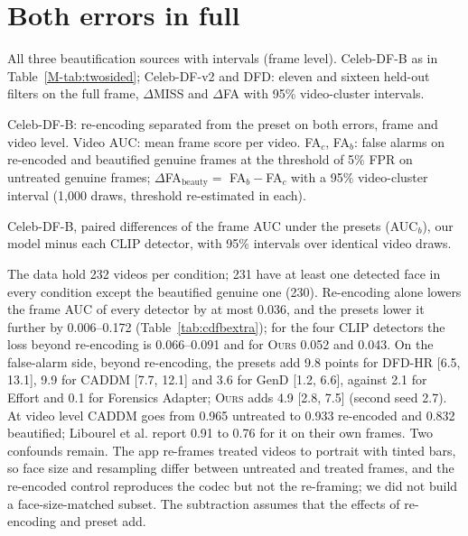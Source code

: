 \documentclass[10pt]{article}
\newcommand{\ours}{\textsc{Ours}}
\begin{document}
\section{Both errors in full}
\label{sec:twosidedfull}
\begin{table}[H]
\centering
\caption{All three beautification sources with intervals (frame level). Celeb-DF-B as in Table~\ref{M-tab:twosided}; Celeb-DF-v2
and DFD: eleven and sixteen held-out filters on the full frame, $\Delta$MISS and $\Delta$FA with 95\% video-cluster intervals.}
\label{tab:twosidedfull}
\scriptsize
\begin{adjustbox}{max width=\linewidth}\end{adjustbox}
\end{table}
\begin{table}[H]
\centering
\caption{Celeb-DF-B: re-encoding separated from the preset on both errors, frame and video level. Video AUC: mean frame score per
video. FA$_c$, FA$_b$: false alarms on re-encoded and beautified genuine frames at the threshold of 5\% FPR on untreated genuine
frames; $\Delta$FA$_\text{beauty}=$ FA$_b-$FA$_c$ with a 95\% video-cluster interval (1,000 draws, threshold re-estimated in each).}
\label{tab:cdfbextra}
\scriptsize
\begin{adjustbox}{max width=\linewidth}\end{adjustbox}
\end{table}
\begin{table}[H]
\centering
\caption{Celeb-DF-B, paired differences of the frame AUC under the presets (AUC$_b$), our model minus each CLIP detector, with
95\% intervals over identical video draws.}
\label{tab:cdfbpaired}
\footnotesize
\begin{adjustbox}{max width=\linewidth}\end{adjustbox}
\end{table}
The data hold 232 videos per condition; 231 have at least one detected face in every condition except the beautified genuine one
(230). Re-encoding alone lowers the frame AUC of every detector by at most 0.036, and the presets lower it further by 0.006--0.172
(Table~\ref{tab:cdfbextra}); for the four CLIP detectors the loss beyond re-encoding is 0.066--0.091 and for \ours{} 0.052 and 0.043.
On the false-alarm side, beyond re-encoding, the presets add 9.8 points for DFD-HR [6.5, 13.1], 9.9 for CADDM [7.7, 12.1] and 3.6 for
GenD [1.2, 6.6], against 2.1 for Effort and 0.1 for Forensics Adapter; \ours{} adds 4.9 [2.8, 7.5] (second seed 2.7). At video
level CADDM goes from 0.965 untreated to 0.933 re-encoded and 0.832 beautified; Libourel et al. report 0.91 to 0.76 for it on
their own frames. Two confounds remain. The app re-frames treated videos to portrait with tinted bars, so face size and
resampling differ between untreated and treated frames, and the re-encoded control reproduces the codec but not the re-framing;
we did not build a face-size-matched subset. The subtraction assumes that the effects of re-encoding and preset add.
\end{document}
